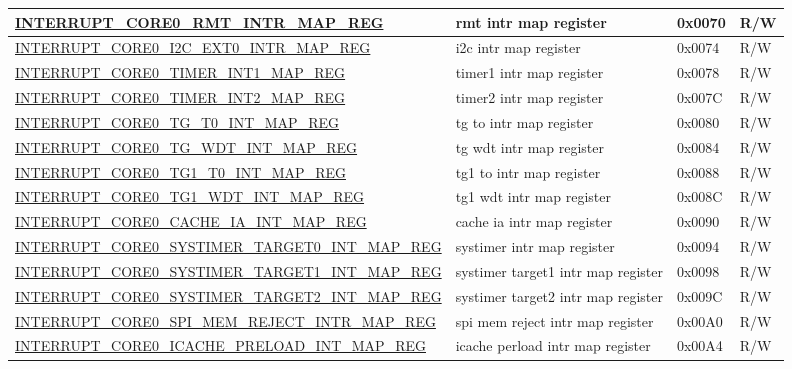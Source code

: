 \begin{longtable}{ | p{6cm} | p{7.2cm} | p{1.3cm} | p{1cm} | }
\hyperref[regdesc:INTERRUPTCORE0RMTINTRMAPREG]{INTERRUPT\_CORE0\_RMT\_INTR\_MAP\_REG} & rmt intr map register & 0x0070 & R/W \\ \hline
\hyperref[regdesc:INTERRUPTCORE0I2CEXT0INTRMAPREG]{INTERRUPT\_CORE0\_I2C\_EXT0\_INTR\_MAP\_REG} & i2c intr map register & 0x0074 & R/W \\ \hline
\hyperref[regdesc:INTERRUPTCORE0TIMERINT1MAPREG]{INTERRUPT\_CORE0\_TIMER\_INT1\_MAP\_REG} & timer1 intr map register & 0x0078 & R/W \\ \hline
\hyperref[regdesc:INTERRUPTCORE0TIMERINT2MAPREG]{INTERRUPT\_CORE0\_TIMER\_INT2\_MAP\_REG} & timer2 intr map register & 0x007C & R/W \\ \hline
\hyperref[regdesc:INTERRUPTCORE0TGT0INTMAPREG]{INTERRUPT\_CORE0\_TG\_T0\_INT\_MAP\_REG} & tg to intr map register & 0x0080 & R/W \\ \hline
\hyperref[regdesc:INTERRUPTCORE0TGWDTINTMAPREG]{INTERRUPT\_CORE0\_TG\_WDT\_INT\_MAP\_REG} & tg wdt intr map register & 0x0084 & R/W \\ \hline
\hyperref[regdesc:INTERRUPTCORE0TG1T0INTMAPREG]{INTERRUPT\_CORE0\_TG1\_T0\_INT\_MAP\_REG} & tg1 to intr map register & 0x0088 & R/W \\ \hline
\hyperref[regdesc:INTERRUPTCORE0TG1WDTINTMAPREG]{INTERRUPT\_CORE0\_TG1\_WDT\_INT\_MAP\_REG} & tg1 wdt intr map register & 0x008C & R/W \\ \hline
\hyperref[regdesc:INTERRUPTCORE0CACHEIAINTMAPREG]{INTERRUPT\_CORE0\_CACHE\_IA\_INT\_MAP\_REG} & cache ia intr map register & 0x0090 & R/W \\ \hline
\hyperref[regdesc:INTERRUPTCORE0SYSTIMERTARGET0INTMAPREG]{INTERRUPT\_CORE0\_SYSTIMER\_TARGET0\_INT\_MAP\_REG} & systimer intr map register & 0x0094 & R/W \\ \hline
\hyperref[regdesc:INTERRUPTCORE0SYSTIMERTARGET1INTMAPREG]{INTERRUPT\_CORE0\_SYSTIMER\_TARGET1\_INT\_MAP\_REG} & systimer target1 intr map register & 0x0098 & R/W \\ \hline
\hyperref[regdesc:INTERRUPTCORE0SYSTIMERTARGET2INTMAPREG]{INTERRUPT\_CORE0\_SYSTIMER\_TARGET2\_INT\_MAP\_REG} & systimer target2 intr map register & 0x009C & R/W \\ \hline
\hyperref[regdesc:INTERRUPTCORE0SPIMEMREJECTINTRMAPREG]{INTERRUPT\_CORE0\_SPI\_MEM\_REJECT\_INTR\_MAP\_REG} & spi mem reject intr map register & 0x00A0 & R/W \\ \hline
\hyperref[regdesc:INTERRUPTCORE0ICACHEPRELOADINTMAPREG]{INTERRUPT\_CORE0\_ICACHE\_PRELOAD\_INT\_MAP\_REG} & icache perload intr map register & 0x00A4 & R/W \\ \hline

\end{longtable}
